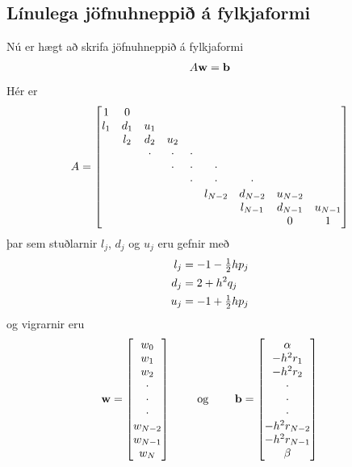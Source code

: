 \documentclass[letterpaper,10pt,icelandic]{sphinxmanual}
\begin{document}
\subsection{Línulega jöfnuhneppið á fylkjaformi}
\label{kafli07:linulega-jofnuhneppi-a-fylkjaformi}
Nú er hægt að skrifa jöfnuhneppið á fylkjaformi
\begin{gather}
\begin{split}A{\mbox{${\bf w}$}}={\mbox{${\bf b}$}}\end{split}\notag
\end{gather}
Hér er
\begin{gather}
\begin{split}A=\left[\begin{matrix}
  1&0\\
  l_1&d_1&u_1\\
  &l_2&d_2&u_2\\
  &&\cdot&\cdot&\cdot \\
  &&&\cdot&\cdot&\cdot \\
  &&&&\cdot&\cdot&\cdot \\
  &&&&&l_{N-2}&d_{N-2}&u_{N-2} \\
  &&&&&&l_{N-1}&d_{N-1}&u_{N-1} \\
  &&&&&&&0&1
  \end{matrix}\right]\end{split}\notag
\end{gather}
þar sem stuðlarnir \(l_j\), \(d_j\) og \(u_j\) eru gefnir
með
\begin{gather}
\begin{split}\begin{aligned}
  l_j&=-1-\tfrac 12 hp_j\\
d_j&=2+h^2q_j\\
u_j&=-1+\tfrac 12 hp_j\end{aligned}\end{split}\notag
\end{gather}
og vigrarnir eru
\begin{gather}
\begin{split}{\mbox{${\bf w}$}}=\left[
  \begin{matrix}
w_0\\ w_1\\ w_2\\ \cdot\\ \cdot\\ \cdot\\
w_{N-2}\\ w_{N-1}\\ w_N
\end{matrix}\right]
\qquad \text{ og } \qquad
{\mbox{${\bf b}$}}=\left[
\begin{matrix}
\alpha \\ -h^2r_1\\ -h^2r_2\\ \cdot \\ \cdot\\ \cdot\\
-h^2r_{N-2}\\ -h^2r_{N-1}\\ \beta
\end{matrix}\right]\end{split}\notag
\end{gather}
\end{document}
